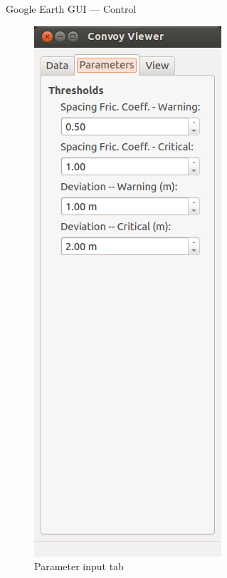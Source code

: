 \documentclass{beamer}
\begin{document}
\begin{frame}{Google Earth GUI --- Control}
\begin{figure}[!htb]
          \includegraphics[height=0.85\textheight]{../graphics/earth_parameters.png}
          \caption{\tiny Parameter input tab}
        \endminipage\hfill
         \centering

\end{figure}
\end{frame}
\end{document}
